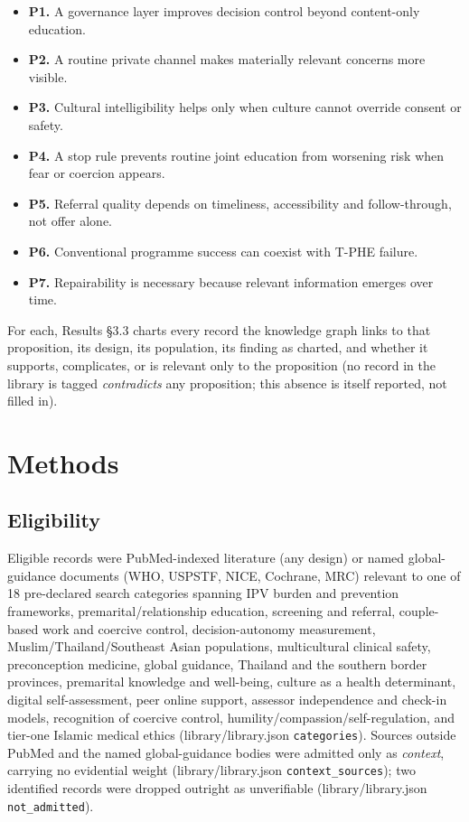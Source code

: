 \documentclass[11pt]{article}
\newcommand{\tphe}{T\mbox{-}PHE}
\begin{document}
\begin{itemize}
\item \textbf{P1.} A governance layer improves decision control beyond content-only education.
\item \textbf{P2.} A routine private channel makes materially relevant concerns more visible.
\item \textbf{P3.} Cultural intelligibility helps only when culture cannot override consent or
safety.
\item \textbf{P4.} A stop rule prevents routine joint education from worsening risk when fear or
coercion appears.
\item \textbf{P5.} Referral quality depends on timeliness, accessibility and follow-through, not
offer alone.
\item \textbf{P6.} Conventional programme success can coexist with \tphe{} failure.
\item \textbf{P7.} Repairability is necessary because relevant information emerges over time.
\end{itemize}

For each, Results \S3.3 charts every record the knowledge graph links to that proposition, its
design, its population, its finding as charted, and whether it supports, complicates, or is
relevant only to the proposition (no record in the library is tagged \emph{contradicts} any
proposition; this absence is itself reported, not filled in).

\section{Methods}

\subsection{Eligibility}
Eligible records were PubMed-indexed literature (any design) or named global-guidance documents
(WHO, USPSTF, NICE, Cochrane, MRC) relevant to one of 18 pre-declared search categories spanning
IPV burden and prevention frameworks, premarital/relationship education, screening and referral,
couple-based work and coercive control, decision-autonomy measurement, Muslim/Thailand/Southeast
Asian populations, multicultural clinical safety, preconception medicine, global guidance,
Thailand and the southern border provinces, premarital knowledge and well-being, culture as a
health determinant, digital self-assessment, peer online support, assessor independence and
check-in models, recognition of coercive control, humility/compassion/self-regulation, and
tier-one Islamic medical ethics (library/library.json \texttt{categories}). Sources outside PubMed
and the named global-guidance bodies were admitted only as \emph{context}, carrying no evidential
weight (library/library.json \texttt{context\_sources}); two identified records were dropped
outright as unverifiable (library/library.json \texttt{not\_admitted}).
\end{document}
